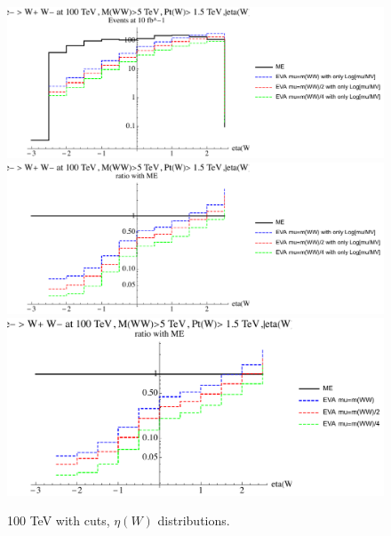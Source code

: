 \documentclass[a4paper,11pt]{article}
\begin{document}
\begin{figure}[!t]
\includegraphics[width=0.46\linewidth]{Notebooks/PlotDistr/WW_WW/100TeVcuts/plotetaW.pdf}
\includegraphics[width=0.46\linewidth]{Notebooks/PlotDistr/WW_WW/100TeVcuts/plotetaWratio1.pdf}
\includegraphics[width=0.46\linewidth]{Notebooks/PlotDistr/WW_WW/100TeVcuts/plotetaWratio2.pdf}
\caption{100 TeV with cuts, $\eta(W)$ distributions. \label{fig:100cutsWWWW2}}
\end{figure}






\clearpage
\pagebreak






\appendix
\end{document}
